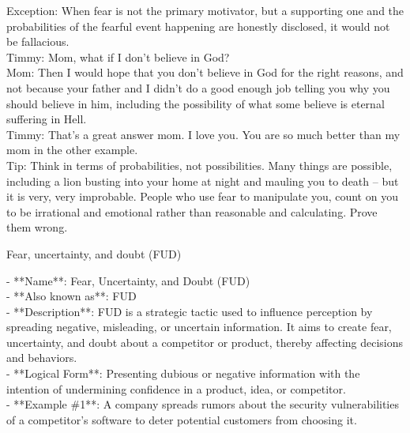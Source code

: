 \documentclass[a4paper,12pt,single,pdftex]{scrartcl}
\begin{document}
{    
      Exception: When fear is not the primary motivator, but a supporting one and the probabilities of the fearful event happening are honestly disclosed, it would not be fallacious.
    \\

    
      Timmy: Mom, what if I don’t believe in God?
    \\

    
      Mom: Then I would hope that you don’t believe in God for the right reasons, and not because your father and I didn’t do a good enough job telling you why you should believe in him, including the possibility of what some believe is eternal suffering in Hell.
    \\

    
      Timmy: That’s a great answer mom.  I love you.  You are so much better than my mom in the other example.
    \\

    
      Tip: Think in terms of probabilities, not possibilities.  Many things are possible, including a lion busting into your home at night and mauling you to death -- but it is very, very improbable.  People who use fear to manipulate you, count on you to be irrational and emotional rather than reasonable and calculating.  Prove them wrong.
    \\

  }


 Fear, uncertainty, and doubt (FUD)
    
      - **Name**: Fear, Uncertainty, and Doubt (FUD)
    \\

    
      - **Also known as**: FUD
    \\

    
      - **Description**: FUD is a strategic tactic used to influence perception by spreading negative, misleading, or uncertain information. It aims to create fear, uncertainty, and doubt about a competitor or product, thereby affecting decisions and behaviors.
    \\

    
      - **Logical Form**: Presenting dubious or negative information with the intention of undermining confidence in a product, idea, or competitor.
    \\

    
      - **Example \#1**: A company spreads rumors about the security vulnerabilities of a competitor's software to deter potential customers from choosing it.
    \\
\end{document}
